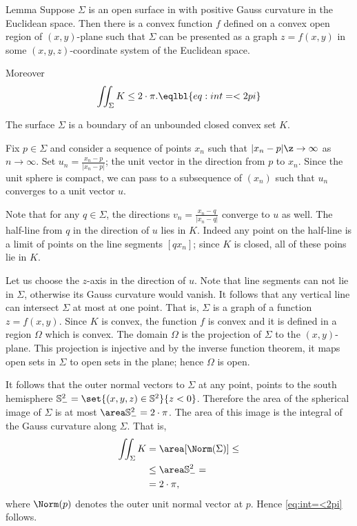 \begin{thm}{Lemma}\label{lem:graph}
Suppose $\Sigma$ is an open surface in with positive Gauss curvature in the Euclidean space.
Then there is a convex function $f$ defined on a convex open region of $(x,y)$-plane 
such that $\Sigma$ can be presented as a graph $z=f(x,y)$ in some $(x,y,z)$-coordinate system of the Euclidean space.

Moreover 
\[\iint_\Sigma K\le 2\cdot\pi.\eqlbl{eq:int=<2pi}\]

\end{thm}

The surface $\Sigma$ is a boundary of an unbounded closed convex set $K$.

Fix $p\in \Sigma$ and consider a sequence of points $x_n$ such that $|x_n-p|\z\to \infty$ as $n\to \infty$.
Set $u_n=\tfrac{x_n-p}{|x_n-p|}$; the unit vector in the direction from $p$ to $x_n$.
Since the unit sphere is compact, we can pass to a subsequence of $(x_n)$ such that $u_n$ converges to a unit vector $u$.

Note that for any $q\in \Sigma$, the directions $v_n=\tfrac{x_n-q}{|x_n-q|}$ converge to $u$ as well.
The half-line from $q$ in the direction of $u$ lies in $K$.
Indeed any point on the half-line is a limit of points on the line segments $[qx_n]$;
since $K$ is closed, all of these poins lie in $K$.


Let us choose the $z$-axis in the direction of $u$.
Note that line segments can not lie in $\Sigma$, otherwise its Gauss curvature would vanish.
It follows that any vertical line can intersect $\Sigma$ at most at one point.
That is, $\Sigma$ is a graph of a function $z=f(x,y)$.
Since $K$ is convex, the function $f$ is convex and it is defined in a region $\Omega$ which is convex.
The domain $\Omega$ is the projection of $\Sigma$ to the $(x,y)$-plane.
This projection is injective and by the inverse function theorem, it maps open sets in $\Sigma$ to open sets in the plane;
hence $\Omega$ is open.

It follows that the outer normal vectors to $\Sigma$ at any point, points to the south hemisphere $\mathbb{S}^2_-=\set{(x,y,z)\in\mathbb{S}^2}{z< 0}$.
Therefore the area of the spherical image of $\Sigma$ is at most $\area\mathbb{S}^2_-= 2\cdot\pi$.
The area of this image is the integral of the Gauss curvature along $\Sigma$.
That is,
\begin{align*}
\iint_{\Sigma}K&=\area[\Norm(\Sigma)]\le 
\\
&\le \area\mathbb{S}^2_-=
\\
&=2\cdot\pi,
\end{align*}
where $\Norm(p)$ denotes the outer unit normal vector at $p$.
Hence \ref{eq:int=<2pi} follows.
\qeds

























